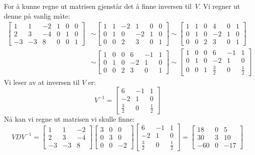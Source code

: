 \documentclass[notitlepage,a4paper,12pt,norsk]{IMFeksamen}
\newcommand{\roweq}{\sim}
\newcommand{\0}{\V{0}}
\newcommand{\oppgslutt}{
\begin{center}
\pgfornament[width=6cm]{88}
\end{center}
}
\newenvironment{losning}{\begin{oppgave}}{\oppgslutt\end{oppgave}}
\begin{document}
\begin{losning}
For å kunne regne ut matrisen gjenstår det å finne inversen til~$V$.
Vi regner ut denne på vanlig måte:
\begin{align*}
\left[\begin{array}{ccc|ccc}
1 & 1 & -2 & 1 & 0 & 0 \\
2 & 3 & -4 & 0 & 1 & 0 \\
-3 & -3 & 8 & 0 & 0 & 1
\end{array}\right]
&
\roweq
\left[\begin{array}{ccc|ccc}
1 & 1 & -2 & 1 & 0 & 0 \\
0 & 1 & 0 & -2 & 1 & 0 \\
0 & 0 & 2 & 3 & 0 & 1
\end{array}\right]
\roweq
\left[\begin{array}{ccc|ccc}
1 & 1 & 0 & 4 & 0 & 1 \\
0 & 1 & 0 & -2 & 1 & 0 \\
0 & 0 & 2 & 3 & 0 & 1
\end{array}\right]
\\
&
\roweq
\left[\begin{array}{ccc|ccc}
1 & 0 & 0 & 6 & -1 & 1 \\
0 & 1 & 0 & -2 & 1 & 0 \\
0 & 0 & 2 & 3 & 0 & 1
\end{array}\right]
\roweq
\left[\begin{array}{ccc|ccc}
1 & 0 & 0 & 6 & -1 & 1 \\
0 & 1 & 0 & -2 & 1 & 0 \\
0 & 0 & 1 & \frac{3}{2} & 0 & \frac{1}{2}
\end{array}\right]
\end{align*}
Vi leser av at inversen til $V$ er:
\[
V^{-1} =
\begin{bmatrix}
6 & -1 & 1 \\
-2 & 1 & 0 \\
\frac{3}{2} & 0 & \frac{1}{2}
\end{bmatrix}
\]
Nå kan vi regne ut matrisen vi skulle finne:
\[
VDV^{-1} =
\begin{bmatrix}
 1 &  1 & -2 \\
 2 &  3 & -4 \\
-3 & -3 &  8
\end{bmatrix}
\begin{bmatrix}
3 & 0 &  0 \\
0 & 3 &  0 \\
0 & 0 & -2
\end{bmatrix}
\begin{bmatrix}
6 & -1 & 1 \\
-2 & 1 & 0 \\
\frac{3}{2} & 0 & \frac{1}{2}
\end{bmatrix}
=
\begin{bmatrix}
 18 & 0 &   5 \\
 30 & 3 &  10 \\
-60 & 0 & -17
\end{bmatrix}
\]
\end{losning}
\end{document}
